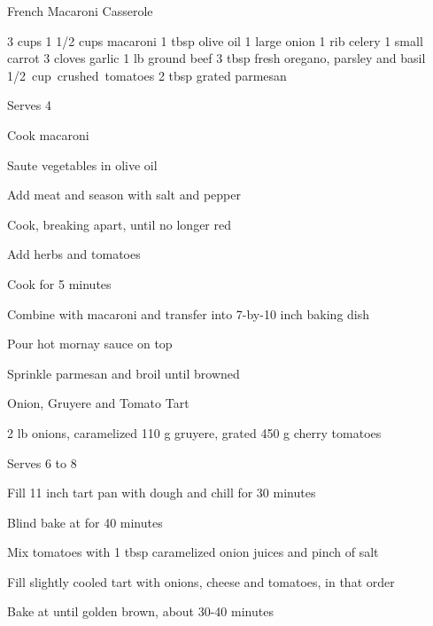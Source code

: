 \begin{denserecipe}{French Macaroni Casserole}{}
\begin{ingredients}
3 cups \mbox{}
1 1/2 cups macaroni
1 tbsp olive oil
1 large onion
1 rib celery
1 small carrot
3 cloves garlic
1 lb ground beef
3 tbsp fresh oregano, parsley and basil
\mbox{1/2 cup crushed tomatoes}
2 tbsp grated parmesan
\end{ingredients}
\nextcolumn
Serves 4
\begin{steps}
    \item Cook macaroni
    \item Saute vegetables in olive oil
    \item Add meat and season with salt and pepper
    \item Cook, breaking apart, until no longer red
    \item Add herbs and tomatoes
    \item Cook for 5 minutes
    \item Combine with macaroni and transfer into \mbox{7-by-10} inch baking dish
    \item Pour hot mornay sauce on top
    \item Sprinkle parmesan and broil until browned
\end{steps}
\end{denserecipe}

\begin{recipe}{Onion, Gruyere and Tomato Tart}{\vegetarian{}}
\begin{ingredients}
\mbox{}
2 lb onions, caramelized
110 g gruyere, grated
450 g cherry tomatoes
\end{ingredients}
\nextcolumn
Serves 6 to 8
\begin{steps}
    \item Fill 11 inch tart pan with dough and chill for 30 minutes
    \item Blind bake at  for 40 minutes
    \item Mix tomatoes with 1 tbsp caramelized onion juices and pinch of salt
    \item Fill slightly cooled tart with onions, cheese and tomatoes, in that order
    \item Bake at  until golden brown, about 30-40 minutes
\end{steps}
\end{recipe}

